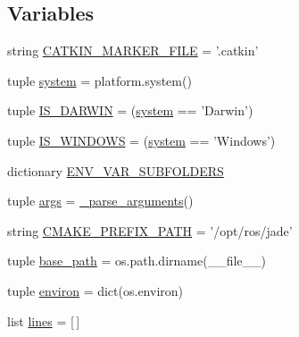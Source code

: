 \subsection*{Variables}
\begin{DoxyCompactItemize}
\item 
string \hyperlink{namespace__setup__util_a3fa0ca5a460a71a43cbc3d4954ab1f10}{C\-A\-T\-K\-I\-N\-\_\-\-M\-A\-R\-K\-E\-R\-\_\-\-F\-I\-L\-E} = '.catkin'
\item 
tuple \hyperlink{namespace__setup__util_a5883fa688e2e824754a412ffc772863e}{system} = platform.\-system()
\item 
tuple \hyperlink{namespace__setup__util_aecbb100ce6f94bb3c7e16d58fde05f96}{I\-S\-\_\-\-D\-A\-R\-W\-I\-N} = (\hyperlink{namespace__setup__util_a5883fa688e2e824754a412ffc772863e}{system} == 'Darwin')
\item 
tuple \hyperlink{namespace__setup__util_a6fe69c2dbd92959b6651a28cbb846e6e}{I\-S\-\_\-\-W\-I\-N\-D\-O\-W\-S} = (\hyperlink{namespace__setup__util_a5883fa688e2e824754a412ffc772863e}{system} == 'Windows')
\item 
dictionary \hyperlink{namespace__setup__util_aa31804f1be8660156ce9394b33c68dc4}{E\-N\-V\-\_\-\-V\-A\-R\-\_\-\-S\-U\-B\-F\-O\-L\-D\-E\-R\-S}
\item 
tuple \hyperlink{namespace__setup__util_ac67cb2d93e0636936bcbeb363e2c87c3}{args} = \hyperlink{namespace__setup__util_a68bdee5b1b36ce340607c5f122fc04ff}{\-\_\-parse\-\_\-arguments}()
\item 
string \hyperlink{namespace__setup__util_a44bed5f85daa4641b3c144edb9e8c1c1}{C\-M\-A\-K\-E\-\_\-\-P\-R\-E\-F\-I\-X\-\_\-\-P\-A\-T\-H} = '/opt/ros/jade'
\item 
tuple \hyperlink{namespace__setup__util_aecc545d18611814ee5d7ccdf6aa55f90}{base\-\_\-path} = os.\-path.\-dirname(\-\_\-\-\_\-file\-\_\-\-\_\-)
\item 
tuple \hyperlink{namespace__setup__util_a0a3189a3fa13a696964c791ed2a5ea85}{environ} = dict(os.\-environ)
\item 
list \hyperlink{namespace__setup__util_a8618d8be5f729d4c9696daa5e083a001}{lines} = \mbox{[}$\,$\mbox{]}
\end{DoxyCompactItemize}


